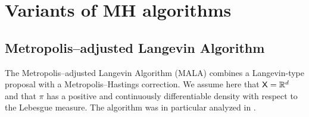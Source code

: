 \documentclass[english,graybox,envcountchap,envcountsame,sectrefs,shortlabels]{svmono}
\theoremstyle{style}
\newcommand{\Xset}{\mathsf{X}}
\begin{document}
\section{Variants of MH algorithms}


\subsection{Metropolis--adjusted Langevin Algorithm}

The Metropolis--adjusted Langevin Algorithm (MALA) combines a Langevin-type proposal with a Metropolis--Hastings correction. We assume here that $\Xset=\rset^d$ and that $\pi$ has a positive and continuously differentiable density with respect to the Lebesgue measure.
The algorithm was in particular analyzed in \cite{roberts1996exponential}.
\end{document}
